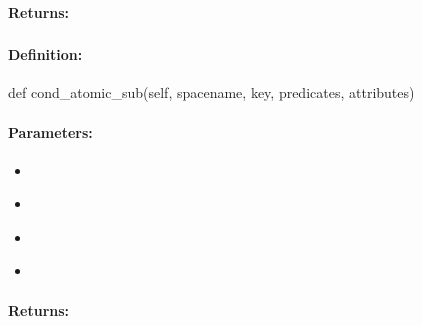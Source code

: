 \paragraph{Returns:}


\pagebreak
\subsubsection{}
\label{api:python:cond_atomic_sub}


\paragraph{Definition:}
\begin{pythoncode}
def cond_atomic_sub(self, spacename, key, predicates, attributes)
\end{pythoncode}

\paragraph{Parameters:}
\begin{itemize}[noitemsep]
\item {}\\

\item {}\\

\item {}\\

\item {}\\

\end{itemize}

\paragraph{Returns:}


\pagebreak
\subsubsection{}
\label{api:python:async_cond_atomic_sub}


